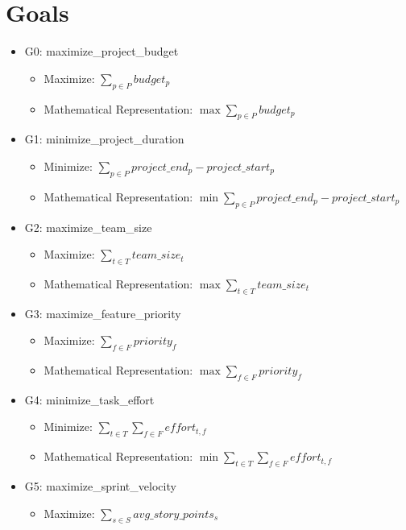 \documentclass{article}
\begin{document}
\section{Goals}
\begin{itemize}
    \item G0: maximize\_project\_budget
        \begin{itemize}
            \item Maximize: $\sum_{p \in P} budget_p$
            \item Mathematical Representation: $\max \sum_{p \in P} budget_p$
        \end{itemize}
    \item G1: minimize\_project\_duration
        \begin{itemize}
            \item Minimize: $\sum_{p \in P} project\_end_p - project\_start_p$
            \item Mathematical Representation: $\min \sum_{p \in P} project\_end_p - project\_start_p$
        \end{itemize}
    \item G2: maximize\_team\_size
        \begin{itemize}
            \item Maximize: $\sum_{t \in T} team\_size_t$
            \item Mathematical Representation: $\max \sum_{t \in T} team\_size_t$
        \end{itemize}
    \item G3: maximize\_feature\_priority
        \begin{itemize}
            \item Maximize: $\sum_{f \in F} priority_f$
            \item Mathematical Representation: $\max \sum_{f \in F} priority_f$
        \end{itemize}
    \item G4: minimize\_task\_effort
        \begin{itemize}
            \item Minimize: $\sum_{t \in T} \sum_{f \in F} effort_{t,f}$
            \item Mathematical Representation: $\min \sum_{t \in T} \sum_{f \in F} effort_{t,f}$
        \end{itemize}
    \item G5: maximize\_sprint\_velocity
        \begin{itemize}
            \item Maximize: $\sum_{s \in S} avg\_story\_points_s$

\end{itemize}
\end{itemize}
\end{document}
